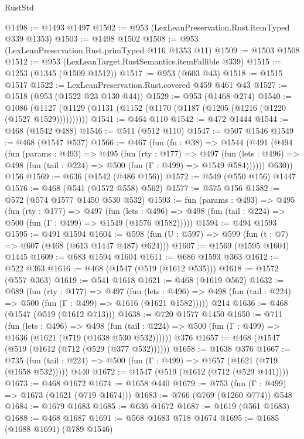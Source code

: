 \begin{lexlean}{RustStd}
\begin{coremodule}
@1498 := @1493 @1497
@1502 := @953 (LexLeanPreservation.Rust.itemTyped @339 @1353)
@1503 := @1498 @1502
@1508 := @953 (LexLeanPreservation.Rust.primTyped @116 @1353 @11)
@1509 := @1503 @1508
@1512 := @953 (LexLeanTarget.RustSemantics.itemFallible @339)
@1515 := @1253 (@1345 (@1509 @1512))
@1517 := @953 (@603 @43)
@1518 := @1515 @1517
@1522 := LexLeanPreservation.Rust.covered @459 @461 @43
@1527 := @1518 (@953 (@1522 @23 @130 @44))
@1529 := @953 (@1468 @274)
@1540 := @1086 (@1127 (@1129 (@1131 (@1152 (@1170 (@1187 (@1205 (@1216 (@1220 (@1527 @1529))))))))))
@1541 := @464 @110
@1542 := @472 @1444
@1544 := @468 (@1542 @488)
@1546 := @511 (@512 @110)
@1547 := @507 @1546
@1549 := @468 (@1547 @537)
@1566 := @467
    (fun (fn : @38) =>
    @1544
      (@491
        (@494
          (fun (params : @493) =>
          @495
            (fun (rty : @177) =>
            @497
              (fun (lets : @496) =>
              @498 (fun (tail : @224) => @500 (fun (Γ : @499) => @1549 @584))))))
        @630))
    @156
@1569 := @636 (@1542 (@486 @156))
@1572 := @549 (@550 @156) @1447
@1576 := @468 (@541 (@1572 @558) @562)
@1577 := @575 @156
@1582 := @572 (@574 @1577 @1450 @530 @532)
@1593 := fun (params : @493) =>
  @495
    (fun (rty : @177) =>
    @497
      (fun (lets : @496) =>
      @498 (fun (tail : @224) => @500 (fun (Γ : @499) => @1549 (@1576 @1582)))))
@1594 := @494 @1593
@1595 := @491 @1594
@1604 := @598 (fun (U : @597) => @599 (fun (t : @7) => @607 (@468 (@613 @1447 @487) @624)))
@1607 := @1569 (@1595 @1604) @1445
@1609 := @683 @1594 @1604
@1611 := @686 @1593 @363
@1612 := @522 @363
@1616 := @468 (@1547 (@519 (@1612 @535)))
@1618 := @1572 (@557 @363)
@1619 := @541 @1618
@1621 := @468 (@1619 @562)
@1632 := @689
    (fun (rty : @177) =>
    @497
      (fun (lets : @496) =>
      @498 (fun (tail : @224) => @500 (fun (Γ : @499) => @1616 (@1621 @1582)))))
    @214
@1636 := @468 (@1547 (@519 (@1612 @713)))
@1638 := @720 @1577 @1450
@1650 := @711
    (fun (lets : @496) =>
    @498 (fun (tail : @224) => @500 (fun (Γ : @499) => @1636 (@1621 (@719 (@1638 @530 @532))))))
    @376
@1657 := @468 (@1547 (@519 (@1612 (@712 (@529 (@377 @532))))))
@1658 := @1638 @376
@1667 := @735 (fun (tail : @224) => @500 (fun (Γ : @499) => @1657 (@1621 (@719 (@1658 @532))))) @440
@1672 := @1547 (@519 (@1612 (@712 (@529 @441))))
@1673 := @468 @1672
@1674 := @1658 @440
@1679 := @753 (fun (Γ : @499) => @1673 (@1621 (@719 @1674)))
@1683 := @766 (@769 (@1260 @774)) @548
@1684 := @1679 @1683
@1685 := @636 @1672
@1687 := @1619 (@561 @1683)
@1688 := @468 @1687
@1691 := @568 @1683 @718 @1674
@1695 := @1685 (@1688 @1691) (@789 @1546)

\end{coremodule}
\end{lexlean}
